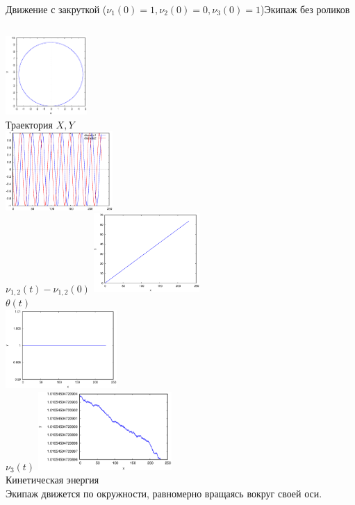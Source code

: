 \documentclass{beamer}
\begin{document}
\begin{frame}{Движение с закруткой ($\nu_1(0) = 1, \nu_2(0) = 0, \nu_3(0) = 1$)}{Экипаж без роликов}
    \begin{columns}
            \centering
            \includegraphics[width=\linewidth, height=30mm]{_old_sol__1_0_1__0__230__1e2_trajectory} \\
            Траектория $X, Y$ \\
            \includegraphics[width=\linewidth, height=30mm]{_old_sol__1_0_1__0__230__1e2_nu12} \\
            $\nu_{1,2}(t) - \nu_{1,2}(0)$
            \centering
            \includegraphics[width=\linewidth, height=30mm]{_old_sol__1_0_1__0__230__1e2_theta} \\
            $\theta(t)$ \\
            \includegraphics[width=\linewidth, height=30mm]{_old_sol__1_0_1__0__230__1e2_nu3} \\
            $\nu_3(t)$
            \centering
            \includegraphics[width=\linewidth, height=30mm]{_old_sol__1_0_1__0__230__1e2_kin_en} \\
            Кинетическая энергия \\
            \vspace{15pt}
            Экипаж движется по окружности, равномерно вращаясь вокруг своей оси.
    \end{columns}
\end{frame}
\end{document}
